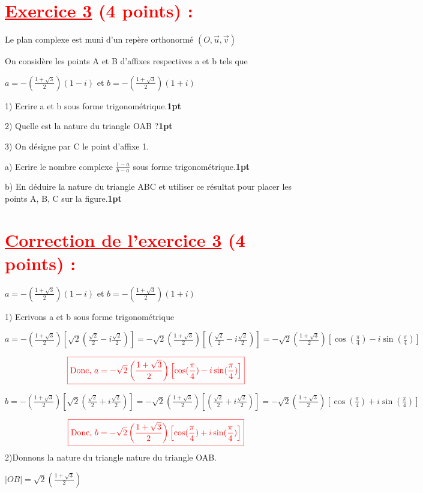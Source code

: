 \documentclass[12pt]{article}
\begin{document}
\section*{\textcolor{red}{\underline{Exercice 3} (4 points) :}}
Le plan complexe est muni d’un repère orthonormé $(O,\vec{u},\vec{v})$

On considère les points A et B d’affixes respectives a et b tels que

$a=-(\frac{1+\sqrt{3}}{2})(1-i)$ et $b=-(\frac{1+\sqrt{3}}{2})(1+i)$ 

1) Ecrire a et b sous forme trigonométrique.\textbf{1pt}

2) Quelle est la nature du triangle OAB ?\textbf{1pt}

3) On désigne par C le point d’affixe 1.

a) Ecrire le nombre complexe $\frac{1-a}{b-a}$  sous forme trigonométrique.\textbf{1pt}

b) En déduire la nature du triangle ABC et  utiliser ce résultat pour placer les points A, B, C sur la figure.\textbf{1pt}
\section*{\textcolor{red}{\underline{Correction de l'exercice 3} (4 points) :}}
$a=-(\frac{1+\sqrt{3}}{2})(1-i)$ et $b=-(\frac{1+\sqrt{3}}{2})(1+i)$ 

1) Ecrivons a et b sous forme trigonométrique

$a=-(\frac{1+\sqrt{3}}{2})\left[\sqrt{2}(\frac{\sqrt{2}}{2}-i\frac{\sqrt{2}}{2})\right]=-\sqrt{2}(\frac{1+\sqrt{3}}{2})\left[(\frac{\sqrt{2}}{2}-i\frac{\sqrt{2}}{2})\right]=-\sqrt{2}(\frac{1+\sqrt{3}}{2})\left[\cos(\frac{\pi}{4})-i\sin(\frac{\pi}{4})\right] $

\[\color{red}{\boxed{\text{Donc, }a=-\sqrt{2}\left( \frac{1+\sqrt{3}}{2}\right) \left[\cos(\frac{\pi}{4})-i\sin(\frac{\pi}{4})\right]} }\]

$b=-(\frac{1+\sqrt{3}}{2})\left[\sqrt{2}(\frac{\sqrt{2}}{2}+i\frac{\sqrt{2}}{2})\right]=-\sqrt{2}(\frac{1+\sqrt{3}}{2})\left[(\frac{\sqrt{2}}{2}+i\frac{\sqrt{2}}{2})\right]=-\sqrt{2}(\frac{1+\sqrt{3}}{2})\left[\cos(\frac{\pi}{4})+i\sin(\frac{\pi}{4})\right] $

\[\color{red}{\boxed{\text{Donc, }b=-\sqrt{2}\left( \frac{1+\sqrt{3}}{2}\right) \left[\cos(\frac{\pi}{4})+i\sin(\frac{\pi}{4})\right]}}\]
2)Donnons la nature du triangle nature du triangle OAB.

$|OB|=\sqrt{2}\left( \frac{1+\sqrt{3}}{2}\right)$
\end{document}
